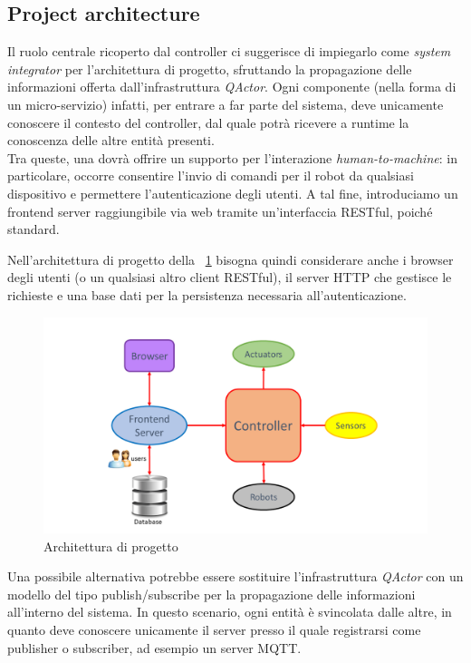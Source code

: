 \documentclass{../llncs}
\newcommand{\qa}{\textsf{\textit{QActor}}\xspace}
\newcommand{\labelfig}[1]{\label{fig:#1}}
\newcommand{\xf}[1]{\figurename~\ref{fig:#1}}
\begin{document}
\subsection{Project architecture}
Il ruolo centrale ricoperto dal controller ci suggerisce di impiegarlo come \emph{system integrator} per l'architettura di progetto, sfruttando la propagazione delle informazioni offerta dall'infrastruttura \qa. Ogni componente (nella forma di un micro-servizio) infatti, per entrare a far parte del sistema, deve unicamente conoscere il contesto del controller, dal quale potrà ricevere a runtime la conoscenza delle altre entità presenti.\\

Tra queste, una dovrà offrire un supporto per l'interazione \textit{human-to-machine}: in particolare, occorre consentire l'invio di comandi per il robot da qualsiasi dispositivo e permettere l'autenticazione degli utenti. A tal fine, introduciamo un frontend server raggiungibile via web tramite un'interfaccia RESTful, poiché standard.

Nell'architettura di progetto della \xf{projArch} bisogna quindi considerare anche i browser degli utenti (o un qualsiasi altro client RESTful), il server HTTP che gestisce le richieste e una base dati per la persistenza necessaria all'autenticazione.

\begin{figure}[!htb]
\centering
\includegraphics[scale=0.4]{img/projectArchitecture.png}
\caption{Architettura di progetto}\labelfig{projArch}
\end{figure}

\vspace{16px}

Una possibile alternativa potrebbe essere sostituire l'infrastruttura \qa con un modello del tipo publish/subscribe per la propagazione delle informazioni all'interno del sistema. In questo scenario, ogni entità è svincolata dalle altre, in quanto deve conoscere unicamente il server presso il quale registrarsi come publisher o subscriber, ad esempio un server MQTT.
\end{document}
